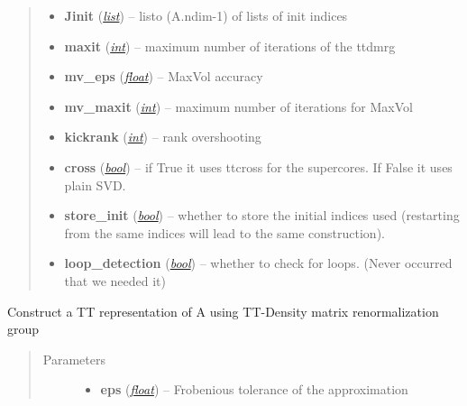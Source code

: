 \documentclass[a4paper,10pt,english]{sphinxmanual}
\begin{document}
\begin{fulllineitems}
\begin{fulllineitems}
\begin{quote}
\begin{description}
\begin{itemize}
\item {} 
\textbf{Jinit} (\href{http://docs.python.org/library/functions.html\#list}{\emph{list}}) -- listo (A.ndim-1) of lists of init indices

\item {} 
\textbf{maxit} (\href{http://docs.python.org/library/functions.html\#int}{\emph{int}}) -- maximum number of iterations of the ttdmrg

\item {} 
\textbf{mv\_eps} (\href{http://docs.python.org/library/functions.html\#float}{\emph{float}}) -- MaxVol accuracy

\item {} 
\textbf{mv\_maxit} (\href{http://docs.python.org/library/functions.html\#int}{\emph{int}}) -- maximum number of iterations for MaxVol

\item {} 
\textbf{kickrank} (\href{http://docs.python.org/library/functions.html\#int}{\emph{int}}) -- rank overshooting

\item {} 
\textbf{cross} (\href{http://docs.python.org/library/functions.html\#bool}{\emph{bool}}) -- if True it uses ttcross for the supercores. If False it uses plain SVD.

\item {} 
\textbf{store\_init} (\href{http://docs.python.org/library/functions.html\#bool}{\emph{bool}}) -- whether to store the initial indices used (restarting from the same indices will lead to the same construction).

\item {} 
\textbf{loop\_detection} (\href{http://docs.python.org/library/functions.html\#bool}{\emph{bool}}) -- whether to check for loops. (Never occurred that we needed it)

\end{itemize}

\end{description}\end{quote}

\end{fulllineitems}


\begin{fulllineitems}
\label{api-ttvec:TensorToolbox.core.TTvec.ttdmrgcross}
Construct a TT representation of A using TT-Density matrix renormalization group
\begin{quote}\begin{description}
\item[{Parameters}] \leavevmode\begin{itemize}
\item {} 
\textbf{eps} (\href{http://docs.python.org/library/functions.html\#float}{\emph{float}}) -- Frobenious tolerance of the approximation


\end{itemize}
\end{description}
\end{quote}
\end{fulllineitems}
\end{fulllineitems}
\end{document}
